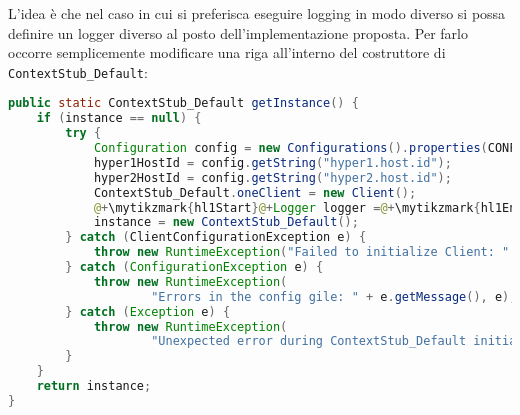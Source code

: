 L'idea è che nel caso in cui si preferisca eseguire logging in modo diverso si possa definire un logger diverso al posto dell'implementazione proposta. Per farlo occorre semplicemente modificare una riga all'interno del costruttore di \texttt{ContextStub\_Default}:
\begin{lstlisting}[language=Java, caption=Costruttore ContextStub\_Default, label=code:CostContextStub]
public static ContextStub_Default getInstance() {
    if (instance == null) {
        try {
            Configuration config = new Configurations().properties(CONFIG_FILE);
            hyper1HostId = config.getString("hyper1.host.id");
            hyper2HostId = config.getString("hyper2.host.id");
            ContextStub_Default.oneClient = new Client();
            @+\mytikzmark{hl1Start}@+Logger logger =@+\mytikzmark{hl1End}@+ @+\mytikzmark{hl2Start}@+FileLoggerFactory.make("logs/virtualMachines.log");@+\mytikzmark{hl2End}@+				inizializeStub(oneClient, logger);
            instance = new ContextStub_Default();
        } catch (ClientConfigurationException e) {
            throw new RuntimeException("Failed to initialize Client: " + e.getMessage(), e);
        } catch (ConfigurationException e) {
            throw new RuntimeException(
                    "Errors in the config gile: " + e.getMessage(), e);
        } catch (Exception e) {
            throw new RuntimeException(
                    "Unexpected error during ContextStub_Default initialization: " + e.getMessage(), e);
        }
    }
    return instance;
}

\end{lstlisting}
